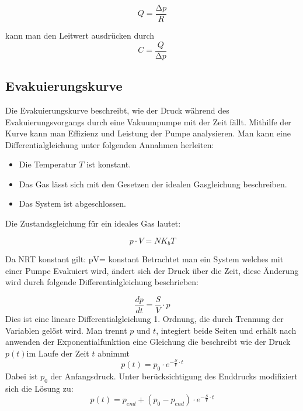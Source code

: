 \begin{equation}
    Q=\frac{\increment p}{R}
    \label{eq:strömungswiderstand1}
\end{equation}

kann man den Leitwert ausdrücken durch
\begin{equation}
    C=\frac{Q}{\increment p}
    \label{eq:leitwert2}
\end{equation} 


\subsection{Evakuierungskurve}
Die Evakuierungskurve beschreibt, wie der Druck während des Evakuierungsvorgangs durch eine Vakuumpumpe 
mit der Zeit fällt. Mithilfe der Kurve kann man Effizienz und Leistung der Pumpe analysieren.
Man kann eine Differentialgleichung unter folgenden Annahmen herleiten:
\begin{itemize}
\item Die Temperatur \(T \) ist konstant. 
\item Das Gas lässt sich mit den Gesetzen der idealen Gasgleichung beschreiben.
\item Das System ist abgeschlossen.
\end{itemize}

Die Zustandsgleichung für ein ideales Gas lautet:

\begin{equation}
    p \cdot V=NK_bT 
\end{equation}

Da N\cdot R\cdot T konstant gilt:  p\cdot V= konstant
Betrachtet man ein System welches mit einer Pumpe Evakuiert wird, ändert sich der Druck über die Zeit, 
diese Änderung wird durch folgende Differentialgleichung beschrieben:

\begin{equation}
    \frac{dp}{dt}=\frac{S}{V}\cdot p
\end{equation}
Dies ist eine lineare Differentialgleichung 1. Ordnung, die durch Trennung der Variablen gelöst wird.
Man trennt \(p \) und \(t \), integiert beide Seiten und erhält nach anwenden der Exponentialfunktion eine
Gleichung die beschreibt wie der Druck \(p(t)\)im Laufe der Zeit \(t \) abnimmt
\begin{equation}
p(t)=p_0\cdot e^{-\frac{S}{V}\cdot t}
\end{equation}
Dabei ist \(p_0\) der Anfangsdruck. Unter berücksichtigung des Enddrucks modifiziert sich die Lösung zu:
\begin{equation}
    p(t)=p_{end}+(p_0-p_{end})\cdot e^{-\frac{S}{V}\cdot t}
\end{equation}
\cite{grundlagen_vakuumtechnik}


